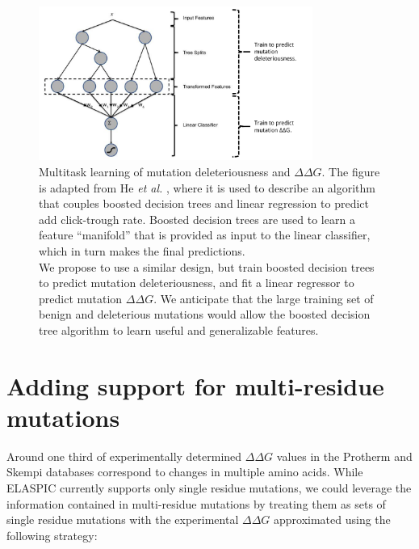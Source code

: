 \begin{figure}[!htb]
	\centering
	\includegraphics[width=0.8\textwidth]{static/elaspic/multitask_learning.pdf}
	\caption[Multitask learning of mutation deleteriousness and $\Delta \Delta G$.]{
		Multitask learning of mutation deleteriousness and $\Delta \Delta G$.
        The figure is adapted from He \textit{et al.} \cite{he_practical_2014}, where it is used to describe an algorithm that couples boosted decision trees and linear regression to predict add click-trough rate. Boosted decision trees are used to learn a feature ``manifold'' that is provided as input to the linear classifier, which in turn makes the final predictions. \\
        We propose to use a similar design, but train boosted decision trees to predict mutation deleteriousness, and fit a linear regressor to predict mutation $\Delta \Delta G$. We anticipate that the large training set of benign and deleterious mutations would allow the boosted decision tree algorithm to learn useful and generalizable features.
	}
	\label{fig:multitask_learning}
\end{figure}


\clearpage
\section{Adding support for multi-residue mutations} \label{sec:more_data}

Around one third of experimentally determined $\Delta \Delta G$ values in the Protherm and Skempi databases correspond to changes in multiple amino acids. While ELASPIC currently supports only single residue mutations, we could leverage the information contained in multi-residue mutations by treating them as sets of single residue mutations with the experimental $\Delta \Delta G$ approximated using the following strategy:


